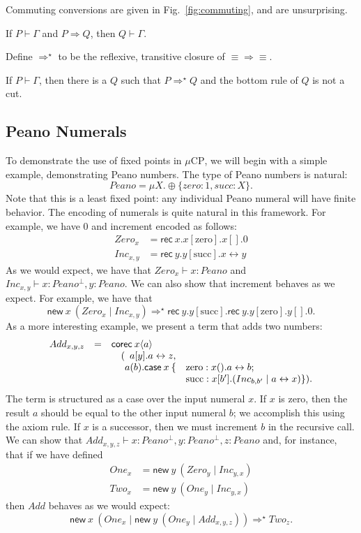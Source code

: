 \documentclass[orivec,envcountsame]{llncs}
\newcommand{\cpdual}[1]{#1^\perp}
\newcommand{\cptyp}[2]{#1 \vdash #2}
\newcommand{\mkwd}[1]{\mathsf{#1}}
\newcommand{\link}[2]{#1 \leftrightarrow #2}
\newcommand{\cut}[4]{\mkwd{new}\:#1 \: (#3 \mid #4)}
\newcommand{\rec}[1]{\mkwd{rec}\:#1}
\newcommand{\clabel}[1]{\mathrm{#1}}
\newcommand{\sel}[2]{#1[\clabel{#2}]}
\newcommand{\mucp}{$\mu\mathrm{CP}$\xspace}
\newcommand{\mcl}[2]{\multicolumn{#1}{l}{#2}}
\begin{document}
Commuting conversions are given in Fig.~\ref{fig:commuting}, and are unsurprising.

\begin{theorem}
  If $\cptyp{P}{\Gamma}$ and $P \Longrightarrow Q$, then $\cptyp{Q}{\Gamma}.$
\end{theorem}

Define $\Longrightarrow^\star$ to be the reflexive, transitive closure of $\equiv\Longrightarrow\equiv$.

\begin{theorem}
  If $\cptyp{P}{\Gamma}$, then there is a $Q$ such that $P \Longrightarrow^\star Q$ and the bottom
  rule of $Q$ is not a cut.
\end{theorem}

\subsection{Peano Numerals}\label{sec:peano}

To demonstrate the use of fixed points in \mucp, we will begin with a simple example, demonstrating
Peano numbers.  The type of Peano numbers is natural:
\[
  Peano = \mu X.\oplus\{zero: 1, succ: X\}.
\]
Note that this is a least fixed point: any individual Peano numeral will have finite behavior.  The
encoding of numerals is quite natural in this framework.  For example, we have 0 and increment
encoded as follows:
\begin{align*}
  Zero_x &= \rec{x}.\sel{x}{zero}.x[].0 \\
  Inc_{x,y} &= \rec{y}.\sel{y}{succ}.\link{x}{y}
\end{align*}
As we would expect, we have that $\cptyp{Zero_x}{x:Peano}$ and
$\cptyp{Inc_{x,y}}{x:\cpdual{Peano},y:Peano}$.  We can also show that increment behaves as we
expect.  For example, we have that
\[
  \cut{x}{Peano}{Zero_x}{Inc_{x,y}} \Longrightarrow^\star \rec{y}.\sel{y}{succ}.\rec{y}.\sel{y}{zero}.y[].0.
\]
As a more interesting example, we present a term that adds two numbers:
\[\begin{array}{rcl@{\hspace{0mm}}ll}
  Add_{x,y,z} & = & \mcl{3}{\mkwd{corec}\:x\langle a \rangle} \\
  & & \quad (&\mcl{2}{a[y].\link{a}{z},} \\
  & & & a(b).\mkwd{case}\:x\:\{&\clabel{zero}: x().\link{a}{b}; \\
  & & & & \clabel{succ}: x[b'].(Inc_{b,b'} \mid  \link{a}{x}) \}).
\end{array}\]
The term is structured as a case over the input numeral $x$.  If $x$ is zero, then the result $a$
should be equal to the other input numeral $b$; we accomplish this using the axiom rule.  If $x$ is
a successor, then we must increment $b$ in the recursive call.  We can show that
$\cptyp{Add_{x,y,z}}{x:\cpdual{Peano}, y:\cpdual{Peano}, z:Peano}$ and, for instance, that if we
have defined
\begin{align*}
  One_x &= \cut{y}{}{Zero_y}{Inc_{y,x}} \\
  Two_x &= \cut{y}{}{One_y}{Inc_{y,x}}
\end{align*}
then $Add$ behaves as we would expect:
\[
  \cut{x}{Peano}{One_x}{\cut{y}{Peano}{One_y}{Add_{x,y,z}}} \Longrightarrow^\star Two_z.
\]
\end{document}
